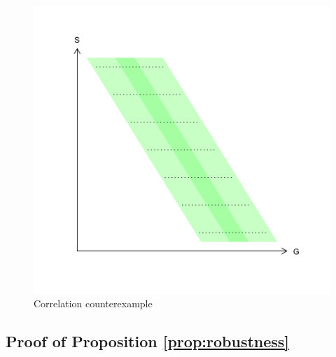 \documentclass[
]{article}
\begin{document}
\begin{figure}
\begin{centering}
\includegraphics[width=0.5\columnwidth]{correlation-counterexample}
\par\end{centering}
\caption{Correlation counterexample\label{fig:Correlation-counterexample}}

\end{figure}

\hypertarget{proof-of-proposition}{%
\subsection{\texorpdfstring{Proof of Proposition \ref{prop:robustness}}{Proof of Proposition }}\label{proof-of-proposition}}
\end{document}
